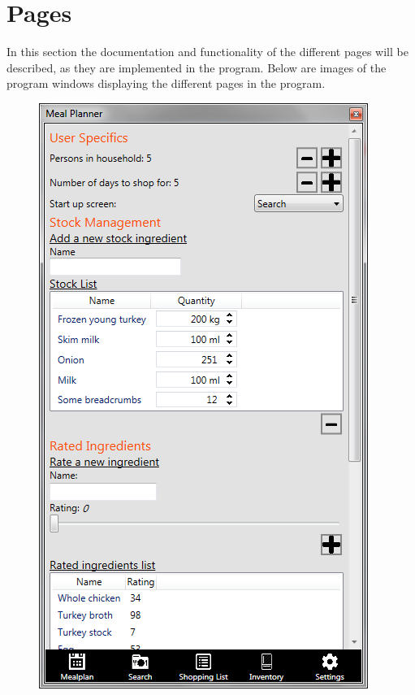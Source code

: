 \section{Pages} \label{PagesLabel}
In this section the documentation and functionality of the different pages will be described, as they are implemented in the program. Below are images of the program windows displaying the different pages in the program.

\begin{figure}[H]
\centering
\begin{minipage}{.33\textwidth}
  \centering
  \includegraphics[width=.9\linewidth]{Grafik/SettingsPage}
  \label{fig:SettnigsPage}

\end{minipage}
\end{figure}
